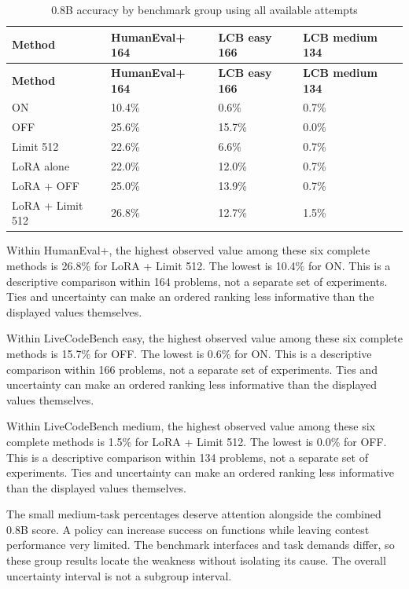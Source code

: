 \documentclass[11pt,letterpaper]{article}
\begin{document}
\begingroup\singlespacing\small\setlength{\tabcolsep}{4pt}
\begin{longtable}{|p{1.455in}|p{1.455in}|p{1.455in}|p{1.455in}|}
\caption{0.8B accuracy by benchmark group using all available attempts}\label{tab:groupsX0X8b}\\
\hline
\textbf{Method} & \textbf{HumanEval+ 164} & \textbf{LCB easy 166} & \textbf{LCB medium 134}\\\hline
\endfirsthead
\hline
\textbf{Method} & \textbf{HumanEval+ 164} & \textbf{LCB easy 166} & \textbf{LCB medium 134}\\\hline
\endhead
ON & 10.4\% & 0.6\% & 0.7\%\\\hline
OFF & 25.6\% & 15.7\% & 0.0\%\\\hline
Limit 512 & 22.6\% & 6.6\% & 0.7\%\\\hline
LoRA alone & 22.0\% & 12.0\% & 0.7\%\\\hline
LoRA + OFF & 25.0\% & 13.9\% & 0.7\%\\\hline
LoRA + Limit  512 & 26.8\% & 12.7\% & 1.5\%\\\hline
\end{longtable}
\endgroup

Within HumanEval+, the highest observed value among these six complete methods is 26.8\% for LoRA + Limit  512. The lowest is 10.4\% for ON. This is a descriptive comparison within 164 problems, not a separate set of experiments. Ties and uncertainty can make an ordered ranking less informative than the displayed values themselves.\par

Within LiveCodeBench easy, the highest observed value among these six complete methods is 15.7\% for OFF. The lowest is 0.6\% for ON. This is a descriptive comparison within 166 problems, not a separate set of experiments. Ties and uncertainty can make an ordered ranking less informative than the displayed values themselves.\par

Within LiveCodeBench medium, the highest observed value among these six complete methods is 1.5\% for LoRA + Limit  512. The lowest is 0.0\% for OFF. This is a descriptive comparison within 134 problems, not a separate set of experiments. Ties and uncertainty can make an ordered ranking less informative than the displayed values themselves.\par

The small medium-task percentages deserve attention alongside the combined 0.8B score. A policy can increase success on functions while leaving contest performance very limited. The benchmark interfaces and task demands differ, so these group results locate the weakness without isolating its cause. The overall uncertainty interval is not a subgroup interval.\par
\end{document}
